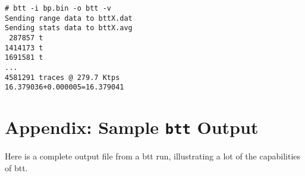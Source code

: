\documentclass{article}
\begin{document}
\begin{verbatim}
# btt -i bp.bin -o btt -v
Sending range data to bttX.dat
Sending stats data to bttX.avg
 287857 t
1414173 t
1691581 t
...
4581291 traces @ 279.7 Ktps
16.379036+0.000005=16.379041
\end{verbatim}

\newpage\section*{\label{sec:appendix}Appendix: Sample \texttt{btt}
Output}
  
  Here is a complete output file from a btt run, illustrating a lot of the
  capabilities of btt.

\end{document}
